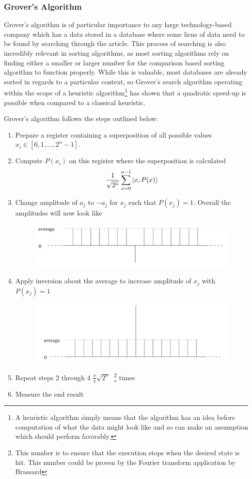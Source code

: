 \documentclass[12pt]{article}
\begin{document}
\subsubsection{Grover's Algorithm}
Grover's algorithm is of particular importance to any large technology-based company which has a data stored in a database where some liens of data need to be found by searching through the article. This process of searching is also incredibly relevant in sorting algorithms, as most sorting algorithms rely on finding either a smaller or larger number for the comparison based sorting algorithm to function properly. While this is valuable, most databases are already sorted in regards to a particular context, so Grover's search algorithm operating within the scope of a heuristic algorithm\footnote{A heuristic algorithm simply means that the algorithm has an idea before computation of what the data might look like and so can make an assumption which should perform favorably.} has shown that a quadratic speed-up is possible when compared to a classical heuristic.\cite{non}\par
Grover's algorithm follows the steps outlined below:
\begin{enumerate}
\item Prepare a register containing a superposition of all possible values $x_i \in [0,1,...,2^n-1]$.
\item Compute $P(x_i)$ on this register where the superposition is calculated $$\frac{1}{\sqrt{2^n}}\sum^{n-1}_{x=0}\ket{x, P(x)}$$
\item Change amplitude of $a_j$ to $-a_j$ for $x_j$ such that $P(x_j) = 1$. Overall the amplitudes will now look like 
\begin{figure}[hb]
  \centering
  \includegraphics[width=.5\textwidth]{amplitude}
\end{figure}
\item Apply inversion about the average to increase amplitude of $x_j$ with $P(x_j)=1$
\begin{figure}[hb]
  \centering
  \includegraphics[width=.5\textwidth]{amplitude2}
\end{figure}
\item Repeat steps 2 through 4 $\frac{\pi}{4}\sqrt{2^n}\:$ \footnote{This number is to ensure that the execution stops when the desired state is hit. This number could be proven by the Fourier transform application by Brassard} times
\item Measure the end result

\end{enumerate}
\end{document}

